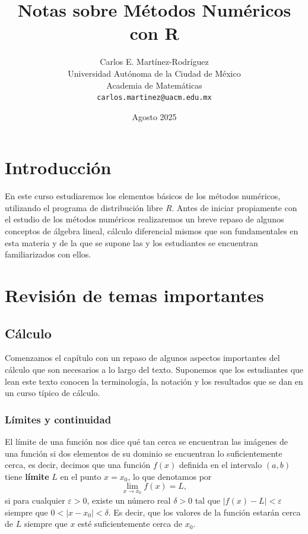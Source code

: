 \documentclass[12pt]{article}
\title{Notas sobre Métodos Numéricos con R}
\author{
Carlos E. Martínez-Rodríguez \\
Universidad Autónoma de la Ciudad de México \\
Academia de Matemáticas \\
\texttt{carlos.martinez@uacm.edu.mx}
}
\date{Agosto 2025}
\date{}
\begin{document}
\maketitle
\tableofcontents


\section{Introducción}

En este curso estudiaremos los elementos básicos de los métodos numéricos, utilizando el programa de distribución libre \textit{R}. Antes de iniciar propiamente con el estudio de los métodos numéricos realizaremos un breve repaso de algunos conceptos de álgebra lineal, cálculo diferencial mismos que son fundamentales en esta materia y de la que se supone las y los estudiantes se encuentran familiarizados con ellos.

\section{Revisión de temas importantes}

\subsection{Cálculo}

Comenzamos el capítulo con un repaso de algunos aspectos importantes del cálculo que son necesarios a lo largo del texto. Suponemos que los estudiantes que lean este texto conocen la terminología, la notación y los resultados que se dan en un curso típico de cálculo.

\subsubsection{Límites y continuidad}

El límite de una función nos dice qué tan cerca se encuentran las imágenes de una función si dos elementos de su dominio se encuentran lo suficientemente cerca, es decir, decimos que una función $f(x)$ definida en el intervalo $(a,b)$ tiene \textbf{límite} $L$ en el punto $x = x_0$, lo que denotamos por $$\lim_{x \to x_0} f(x) = L,$$ si para cualquier $\varepsilon > 0$, existe un número real $\delta > 0$ tal que $|f(x) - L| < \varepsilon$ siempre que $0 < |x - x_0| < \delta $. Es decir, que los valores de la función estarán cerca de $L$ siempre que $x$ esté suficientemente cerca de $x_0$.
\bigskip
\end{document}
